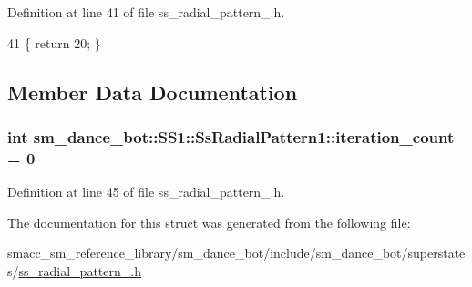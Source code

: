 Definition at line 41 of file ss\+\_\+radial\+\_\+pattern\+\_.\+h.


\begin{DoxyCode}
41 \{ \textcolor{keywordflow}{return} 20; \}
\end{DoxyCode}


\subsection{Member Data Documentation}
\subsubsection[{\texorpdfstring{iteration\+\_\+count}{iteration_count}}]{\setlength{\rightskip}{0pt plus 5cm}int sm\+\_\+dance\+\_\+bot\+::\+S\+S1\+::\+Ss\+Radial\+Pattern1\+::iteration\+\_\+count = 0}\hypertarget{structsm__dance__bot_1_1SS1_1_1SsRadialPattern1_a148a819e2406f494f14afae15e1497b5}{}\label{structsm__dance__bot_1_1SS1_1_1SsRadialPattern1_a148a819e2406f494f14afae15e1497b5}


Definition at line 45 of file ss\+\_\+radial\+\_\+pattern\+\_.\+h.



The documentation for this struct was generated from the following file\+:\begin{DoxyCompactItemize}
\item 
smacc\+\_\+sm\+\_\+reference\+\_\+library/sm\+\_\+dance\+\_\+bot/include/sm\+\_\+dance\+\_\+bot/superstates/\hyperlink{include_2sm__dance__bot_2superstates_2ss__radial__pattern__1_8h}{ss\+\_\+radial\+\_\+pattern\+\_.\+h}\end{DoxyCompactItemize}
